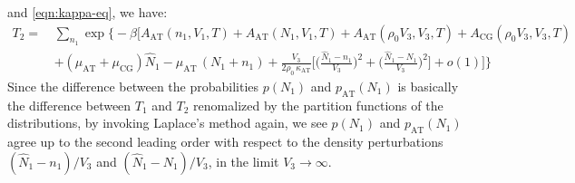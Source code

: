 \documentclass[aip,jcp,a4paper,reprint,onecolumn]{revtex4-1}
\newcommand{\AT}{{\textrm{{AT}}}}
\newcommand{\CG}{{\textrm{CG}}}
\begin{document}
and \eqref{eqn:kappa-eq}, we have:
\begin{align}\nonumber
  T_2
  = \,&
  \sum_{n_1}
  \exp
  \Big\{-\beta
  \Big[
  A_{\AT}(n_1,V_1,T) +
  A_{\AT}(N_1,V_1,T) +
  A_{\AT}(\rho_0V_3,V_3,T) +
  A_{\CG}(\rho_0V_3,V_3,T) \\
  \,&+(\mu_\AT + \mu_\CG)\hat N_1
  -\mu_{\AT}\,(N_1 + n_1) +
  \frac{V_3}{2\rho_0\, \kappa_{\AT}}
  \Big[
  \Big(
  \frac{\hat N_1 - n_1}{V_3}
  \Big)^2
  +
  \Big(
  \frac{\hat N_1 - N_1}{V_3}
  \Big)^2
  \Big]
  + o(1)
  \Big]
  \Big\}
\end{align}
Since the difference between the probabilities
$p(N_1)$ and $p_{\AT}(N_1)$ is basically the difference between $T_1$
and $T_2$ renomalized by the partition functions of the distributions,
by
invoking Laplace's method again,
we see $p(N_1)$ and $p_{\AT}(N_1)$ agree up to
the second leading
order with respect to the density perturbations
$(\hat N_1 - n_1)/{V_3}$
and $(\hat N_1 - N_1)/{V_3}$,
in the limit $V_{3}\to\infty$.


\end{document}
